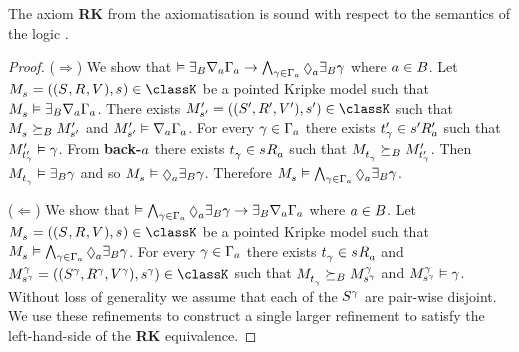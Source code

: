 \begin{lemma}\label{rml-k-rk}
The axiom {\bf RK} from the axiomatisation \axiomRmlK{} is sound with respect to the semantics of the logic \logicRmlK{}.
\end{lemma}

\begin{proof}
($\Rightarrow$) 
We show that $\entails \somerefsBs \coversA \Gamma_\agentA \implies \bigwedge_{\gamma \in \Gamma_\agentA} \possibleA \somerefsBs \gamma$ where $\agentA \in \agentsB$.
Let $\kPModelAndTuple{\kStateS} \in \classK$ be a pointed Kripke model such that $\kPModel{\kStateS} \entails \somerefsBs \coversA \Gamma_\agentA$.
There exists $\kPModelAndTupleP{\kStateSP} \in \classK$ such that $\kPModel{\kStateS} \simulatesBs \kPModelP{\kStateSP}$ and $\kPModelP{\kStateSP} \entails \coversA \Gamma_\agentA$.
For every $\gamma \in \Gamma_\agentA$ there exists $\kStateTP_\gamma \in \kSuccessorsPA{\kStateSP}$ such that $\kPModelP{\kStateTP_\gamma} \entails \gamma$.
From {\bf back-$\agentA$} there exists $\kStateT_\gamma \in \kSuccessorsA{\kStateS}$ such that $\kPModel{\kStateT_\gamma} \simulatesBs \kPModelP{\kStateTP_\gamma}$.
Then $\kPModel{\kStateT_\gamma} \entails \somerefsBs \gamma$ and so $\kPModel{\kStateS} \entails \possibleA \somerefsBs \gamma$.
Therefore $\kPModel{\kStateS} \entails \bigwedge_{\gamma \in \Gamma_\agentA} \possibleA \somerefsBs \gamma$.

($\Leftarrow$) 
We show that $\entails \bigwedge_{\gamma \in \Gamma_\agentA} \possibleA \somerefsBs \gamma \implies \somerefsBs \coversA \Gamma_\agentA$ where $\agentA \in \agentsB$.
Let $\kPModelAndTuple{\kStateS} \in \classK$ be a pointed Kripke model such that $\kPModel{\kStateS} \entails \bigwedge_{\gamma \in \Gamma_\agentA} \possibleA \somerefsBs \gamma$.
For every $\gamma \in \Gamma_\agentA$ there exists $\kStateT_\gamma \in \kSuccessorsA{\kStateS}$ and $\kPModelAndTuple[\gamma]{\kStateS[\gamma]} \in \classK$ such that $\kPModel{\kStateT_\gamma} \simulatesBs \kPModel[\gamma]{\kStateS[\gamma]}$ and $\kPModel[\gamma]{\kStateS[\gamma]} \entails \gamma$.
Without loss of generality we assume that each of the $\kStates[\gamma]$ are pair-wise disjoint.
We use these refinements to construct a single larger refinement to satisfy the left-hand-side of the {\bf RK} equivalence.


\end{proof}
